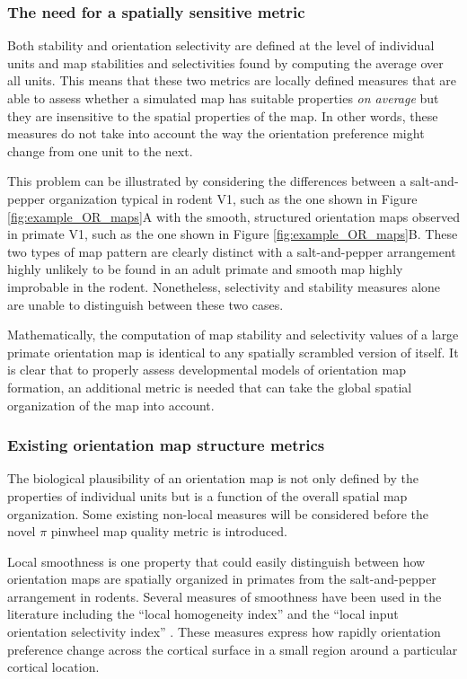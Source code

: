 \documentclass[phd,ianc,twoside]{infthesis}
\begin{document}
\subsubsection*{The need for a spatially sensitive metric}

Both stability and orientation selectivity are defined at the level of
individual units and map stabilities and selectivities found by
computing the average over all units. This means that these two metrics
are locally defined measures that are able to assess whether a simulated
map has suitable properties \emph{on average} but they are insensitive
to the spatial properties of the map. In other words, these measures do
not take into account the way the orientation preference might change
from one unit to the next.

This problem can be illustrated by considering the differences between a
salt-and-pepper organization typical in rodent V1, such as the one shown
in Figure \ref{fig:example_OR_maps}A with the smooth, structured
orientation maps observed in primate V1, such as the one shown in Figure
\ref{fig:example_OR_maps}B. These two types of map pattern are clearly
distinct with a salt-and-pepper arrangement highly unlikely to be found
in an adult primate and smooth map highly improbable in the
rodent. Nonetheless, selectivity and stability measures alone are unable
to distinguish between these two cases.

Mathematically, the computation of map stability and selectivity values
of a large primate orientation map is identical to any spatially
scrambled version of itself. It is clear that to properly assess
developmental models of orientation map formation, an additional metric
is needed that can take the global spatial organization of the map into
account.

\subsubsection*{Existing orientation map structure metrics}

The biological plausibility of an orientation map is not only defined by
the properties of individual units but is a function of the overall
spatial map organization. Some existing non-local measures will be
considered before the novel $\pi$ pinwheel map quality metric is
introduced.

Local smoothness is one property that could easily distinguish between
how orientation maps are spatially organized in primates from the
salt-and-pepper arrangement in rodents.  Several measures of smoothness
have been used in the literature including the ``local homogeneity
index'' \citep{nauhaus_neuron08} and the ``local input orientation
selectivity index'' \citep{schummers_jpp04}. These measures express how
rapidly orientation preference change across the cortical surface in a
small region around a particular cortical location.
\end{document}
